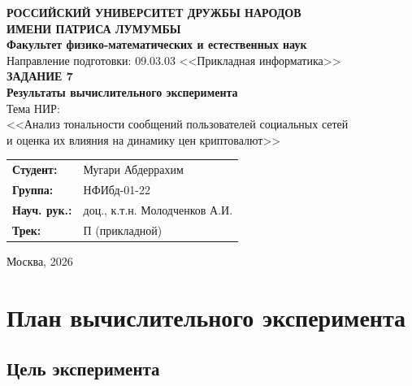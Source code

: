 \documentclass[a4paper,12pt]{article}
\begin{document}

\begin{titlepage}
\begin{center}

\textbf{РОССИЙСКИЙ УНИВЕРСИТЕТ ДРУЖБЫ НАРОДОВ\\ИМЕНИ ПАТРИСА ЛУМУМБЫ}\\[0.3cm]
\textbf{Факультет физико-математических и естественных наук}\\[0.3cm]
Направление подготовки: 09.03.03 <<Прикладная информатика>>\\[2cm]

{\Large \textbf{ЗАДАНИЕ 7}}\\[0.5cm]
{\large \textbf{Результаты вычислительного эксперимента}}\\[1cm]

{\large Тема НИР:}\\[0.3cm]
{\large <<Анализ тональности сообщений пользователей социальных сетей\\
и оценка их влияния на динамику цен криптовалют>>}\\[2cm]

\begin{tabular}{ll}
\textbf{Студент:} & Мугари Абдеррахим \\
\textbf{Группа:} & НФИбд-01-22 \\
\textbf{Науч. рук.:} & доц., к.т.н. Молодченков А.И. \\
\textbf{Трек:} & П (прикладной) \\
\end{tabular}

\vfill
Москва, 2026

\end{center}
\end{titlepage}

\tableofcontents
\newpage


\section{План вычислительного эксперимента}

\subsection{Цель эксперимента}
\end{document}
